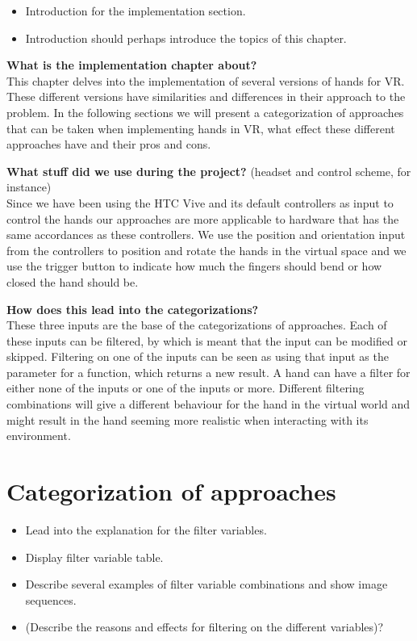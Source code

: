 \begin{itemize}
\item Introduction for the implementation section.
\item Introduction should perhaps introduce the topics of this chapter.
\end{itemize}

\textbf{What is the implementation chapter about?}\\
This chapter delves into the implementation of several versions of hands for VR. These different versions have similarities and differences in their approach to the problem. In the following sections we will present a categorization of approaches that can be taken when implementing hands in VR, what effect these different approaches have and their pros and cons.

\textbf{What stuff did we use during the project?} (headset and control scheme, for instance)\\
Since we have been using the HTC Vive and its default controllers as input to control the hands our approaches are more applicable to hardware that has the same accordances as these controllers. We use the position and orientation input from the controllers to position and rotate the hands in the virtual space and we use the trigger button to indicate how much the fingers should bend or how closed the hand should be.

\textbf{How does this lead into the categorizations?}\\
These three inputs are the base of the categorizations of approaches. Each of these inputs can be filtered, by which is meant that the input can be modified or skipped. Filtering on one of the inputs can be seen as using that input as the parameter for a function, which returns a new result. A hand can have a filter for either none of the inputs or one of the inputs or more. Different filtering combinations will give a different behaviour for the hand in the virtual world and might result in the hand seeming more realistic when interacting with its environment.

\section{Categorization of approaches}
\label{sec:categorizationOfApproaches}
\begin{itemize}
\item Lead into the explanation for the filter variables.
\item Display filter variable table.
\item Describe several examples of filter variable combinations and show image sequences.
\item (Describe the reasons and effects for filtering on the different variables)?
\end{itemize}

